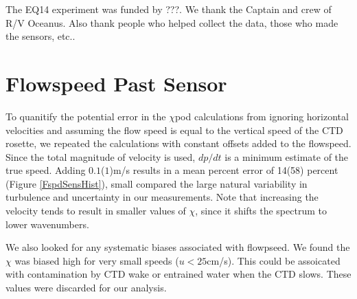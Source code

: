 \documentclass{ametsoc}
\begin{document}
%
\acknowledgments
The EQ14 experiment was funded by ???. We thank the Captain and crew of R/V Oceanus. Also thank people who helped collect the data, those who made the sensors, etc..


%


%


\appendix[A]


\section{Flowspeed Past Sensor}

To quanitify the potential error in the $\chi$pod calculations from ignoring horizontal velocities and assuming the flow speed is equal to the vertical speed of the CTD rosette, we repeated the calculations with constant offsets added to the flowspeed. Since the total magnitude of velocity is used, $dp/dt$ is a minimum estimate of the true speed. Adding $0.1$($1$)m/s results in a mean percent error of 14(58) percent (Figure \ref{FspdSensHist}), small compared the large natural variability in turbulence and uncertainty in our measurements. Note that increasing the velocity tends to result in smaller values of $\chi$, since it shifts the spectrum to lower wavenumbers. 

We also looked for any systematic biases associated with flowpseed. We found the $\chi$ was biased high for very small speeds ($u<25$cm/s). This could be assoicated with contamination by CTD wake or entrained water when the CTD slows.  These values were discarded for our analysis.
\end{document}
